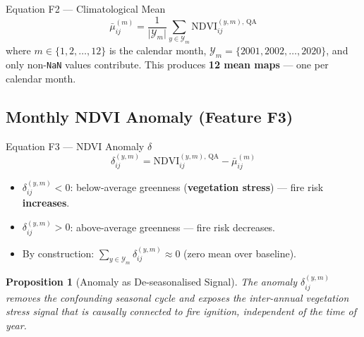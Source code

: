 \documentclass[12pt, a4paper]{article}
\newtheorem{proposition}{Proposition}[section]
\begin{document}
\begin{mathbox}{Equation F2 — Climatological Mean}
\begin{equation}
  \bar{\mu}_{ij}^{(m)} =
  \frac{1}{\lvert\mathcal{Y}_{m}\rvert}
  \sum_{y \in \mathcal{Y}_{m}}
  \mathrm{NDVI}_{ij}^{(y,m),\,\mathrm{QA}}
  \label{eq:clim_mean}
\end{equation}
where $m \in \{1, 2, \ldots, 12\}$ is the calendar month,
$\mathcal{Y}_{m} = \{2001, 2002, \ldots, 2020\}$,
and only non-\texttt{NaN} values contribute.
This produces \textbf{12 mean maps} --- one per calendar month.
\end{mathbox}

\subsection{Monthly NDVI Anomaly (Feature F3)}

\begin{mathbox}{Equation F3 — NDVI Anomaly $\delta$}
\begin{equation}
  \boxed{
    \delta_{ij}^{(y,m)} =
    \mathrm{NDVI}_{ij}^{(y,m),\,\mathrm{QA}} - \bar{\mu}_{ij}^{(m)}
  }
  \label{eq:anomaly}
\end{equation}
\begin{itemize}
  \item $\delta_{ij}^{(y,m)} < 0$: below-average greenness
        (\textbf{vegetation stress}) --- fire risk \textbf{increases}.
  \item $\delta_{ij}^{(y,m)} > 0$: above-average greenness
        --- fire risk decreases.
  \item By construction: $\sum_{y \in \mathcal{Y}_m}
        \delta_{ij}^{(y,m)} \approx 0$
        (zero mean over baseline).
\end{itemize}
\end{mathbox}

\begin{proposition}[Anomaly as De-seasonalised Signal]
The anomaly $\delta_{ij}^{(y,m)}$ removes the confounding seasonal
cycle and exposes the inter-annual vegetation stress signal that is
causally connected to fire ignition, independent of the time of year.
\end{proposition}
\end{document}
